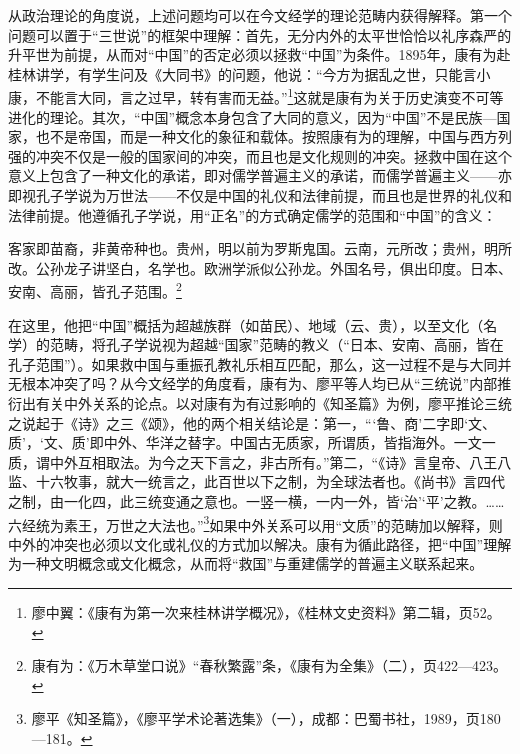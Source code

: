 \documentclass[a4paper, 12pt, openright]{ctexbook}
\renewenvironment{quote}
  {\list{}{\rightmargin2\ccwd \leftmargin2\ccwd \itemindent=2\ccwd \listparindent=2\ccwd}%
   \item\relax\small\kaishu\color{black}}
  {\endlist}
\begin{document}
从政治理论的角度说，上述问题均可以在今文经学的理论范畴内获得解释。第一个问题可以置于“三世说”的框架中理解：首先，无分内外的太平世恰恰以礼序森严的升平世为前提，从而对“中国”的否定必须以拯救“中国”为条件。1895年，康有为赴桂林讲学，有学生问及《大同书》的问题，他说：“今方为据乱之世，只能言小康，不能言大同，言之过早，转有害而无益。”\footnote{廖中翼：《康有为第一次来桂林讲学概况》，《桂林文史资料》第二辑，页52。}这就是康有为关于历史演变不可等进化的理论。其次，“中国”概念本身包含了大同的意义，因为“中国”不是民族—国家，也不是帝国，而是一种文化的象征和载体。按照康有为的理解，中国与西方列强的冲突不仅是一般的国家间的冲突，而且也是文化规则的冲突。拯救中国在这个意义上包含了一种文化的承诺，即对儒学普遍主义的承诺，而儒学普遍主义——亦即视孔子学说为万世法——不仅是中国的礼仪和法律前提，而且也是世界的礼仪和法律前提。他遵循孔子学说，用“正名”的方式确定儒学的范围和“中国”的含义：

\begin{quote}
客家即苗裔，非黄帝种也。贵州，明以前为罗斯鬼国。云南，元所改；贵州，明所改。公孙龙子讲坚白，名学也。欧洲学派似公孙龙。外国名号，俱出印度。日本、安南、高丽，皆孔子范围。\footnote{康有为：《万木草堂口说》“春秋繁露”条，《康有为全集》（二），页422—423。}
\end{quote}

在这里，他把“中国”概括为超越族群（如苗民）、地域（云、贵），以至文化（名学）的范畴，将孔子学说视为超越“国家”范畴的教义（“日本、安南、高丽，皆在孔子范围”）。如果救中国与重振孔教礼乐相互匹配，那么，这一过程不是与大同并无根本冲突了吗？从今文经学的角度看，康有为、廖平等人均已从“三统说”内部推衍出有关中外关系的论点。以对康有为有过影响的《知圣篇》为例，廖平推论三统之说起于《诗》之三《颂》，他的两个相关结论是：第一，“‘鲁、商’二字即‘文、质’，‘文、质’即中外、华洋之替字。中国古无质家，所谓质，皆指海外。一文一质，谓中外互相取法。为今之天下言之，非古所有。”第二，“《诗》言皇帝、八王八监、十六牧事，就大一统言之，此百世以下之制，为全球法者也。《尚书》言四代之制，由一化四，此三统变通之意也。一竖一横，一内一外，皆‘治’‘平’之教。……六经统为素王，万世之大法也。”\footnote{廖平《知圣篇》，《廖平学术论著选集》（一），成都：巴蜀书社，1989，页180—181。}如果中外关系可以用“文质”的范畴加以解释，则中外的冲突也必须以文化或礼仪的方式加以解决。康有为循此路径，把“中国”理解为一种文明概念或文化概念，从而将“救国”与重建儒学的普遍主义联系起来。
\end{document}
